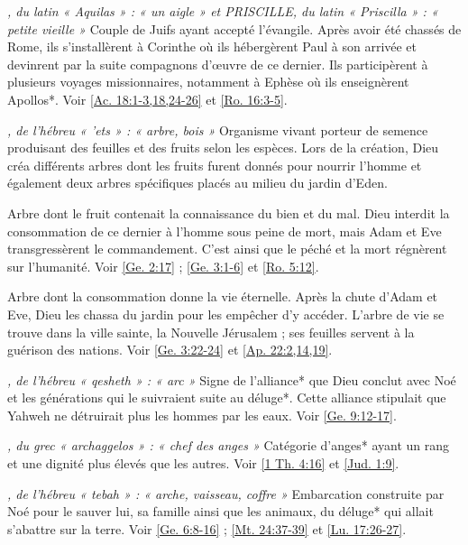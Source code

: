 \begin{multicols}{2}
\textit{, du latin « Aquilas » : « un aigle » et PRISCILLE, du latin « Priscilla » : « petite vieille »}\newline
Couple de Juifs ayant accepté l'évangile. Après avoir été chassés de Rome, ils s'installèrent à Corinthe où ils hébergèrent Paul à son arrivée et devinrent par la suite compagnons d'œuvre de ce dernier. Ils participèrent à plusieurs voyages missionnaires, notamment à Ephèse où ils enseignèrent Apollos*. Voir \vref{Ac. 18:1-3,18,24-26} et \vref{Ro. 16:3-5}.

\textit{, de l'hébreu « 'ets » : « arbre, bois »}\newline
Organisme vivant porteur de semence produisant des feuilles et des fruits selon les espèces. Lors de la création, Dieu créa différents arbres dont les fruits furent donnés pour nourrir l'homme et également deux arbres spécifiques placés au milieu du jardin d'Eden.

\textit{}\newline
Arbre dont le fruit contenait la connaissance du bien et du mal. Dieu interdit la consommation de ce dernier à l'homme sous peine de mort, mais Adam et Eve transgressèrent le commandement. C'est ainsi que le péché et la mort régnèrent sur l'humanité. Voir \vref{Ge. 2:17} ; \vref{Ge. 3:1-6} et \vref{Ro. 5:12}.

\textit{}\newline
Arbre dont la consommation donne la vie éternelle. Après la chute d'Adam et Eve, Dieu les chassa du jardin pour les empêcher d'y accéder. L'arbre de vie se trouve dans la ville sainte, la Nouvelle Jérusalem ; ses feuilles servent à la guérison des nations. Voir \vref{Ge. 3:22-24} et \vref{Ap. 22:2,14,19}.

\textit{, de l'hébreu « qesheth » : « arc »}\newline
Signe de l'alliance* que Dieu conclut avec Noé et les générations qui le suivraient suite au déluge*. Cette alliance stipulait que Yahweh ne détruirait plus les hommes par les eaux. Voir \vref{Ge. 9:12-17}.

\textit{, du grec « archaggelos » : « chef des anges »}\newline
Catégorie d'anges* ayant un rang et une dignité plus élevés que les autres. Voir \vref{1 Th. 4:16} et \vref{Jud. 1:9}.

\textit{, de l'hébreu « tebah » : « arche, vaisseau, coffre »}\newline
Embarcation construite par Noé pour le sauver lui, sa famille ainsi que les animaux, du déluge* qui allait s'abattre sur la terre. Voir \vref{Ge. 6:8-16} ; \vref{Mt. 24:37-39} et \vref{Lu. 17:26-27}.


\end{multicols}
